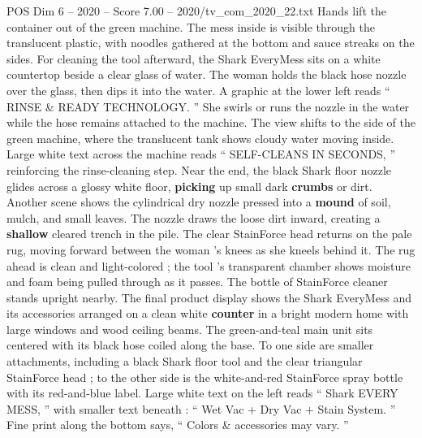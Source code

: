 \begin{textsample}{POS Dim 6 – 2020 – Score 7.00 – 2020/tv\_com\_2020\_22.txt}
Hands lift the container out of the green machine.
The mess inside is visible through the translucent plastic, with noodles gathered at the bottom and sauce streaks on the sides.
For cleaning the tool afterward, the Shark EveryMess sits on a white countertop beside a clear glass of water.
The woman holds the black hose nozzle over the glass, then dips it into the water.
A graphic at the lower left reads “ RINSE \& READY TECHNOLOGY. ” She swirls or runs the nozzle in the water while the hose remains attached to the machine.
The view shifts to the side of the green machine, where the translucent tank shows cloudy water moving inside.
Large white text across the machine reads “ SELF-CLEANS IN SECONDS, ” reinforcing the rinse-cleaning step.
Near the end, the black Shark floor nozzle glides across a glossy white floor, \textbf{picking} up small dark \textbf{crumbs} or dirt.
Another scene shows the cylindrical dry nozzle pressed into a \textbf{mound} of soil, mulch, and small leaves.
The nozzle draws the loose dirt inward, creating a \textbf{shallow} cleared trench in the pile.
The clear StainForce head returns on the pale rug, moving forward between the woman ’s knees as she kneels behind it.
The rug ahead is clean and light-colored ; the tool ’s transparent chamber shows moisture and foam being pulled through as it passes.
The bottle of StainForce cleaner stands upright nearby.
The final product display shows the Shark EveryMess and its accessories arranged on a clean white \textbf{counter} in a bright modern home with large windows and wood ceiling beams.
The green-and-teal main unit sits centered with its black hose coiled along the base.
To one side are smaller attachments, including a black Shark floor tool and the clear triangular StainForce head ; to the other side is the white-and-red StainForce spray bottle with its red-and-blue label.
Large white text on the left reads “ Shark EVERY MESS, ” with smaller text beneath : “ Wet Vac + Dry Vac + Stain System. ” Fine print along the bottom says, “ Colors \& accessories may vary. ”

\end{textsample}
